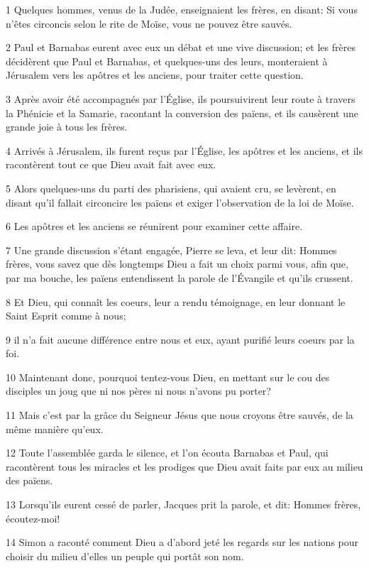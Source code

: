 \par 1 Quelques hommes, venus de la Judée, enseignaient les frères, en disant: Si vous n'êtes circoncis selon le rite de Moïse, vous ne pouvez être sauvés.
\par 2 Paul et Barnabas eurent avec eux un débat et une vive discussion; et les frères décidèrent que Paul et Barnabas, et quelques-uns des leurs, monteraient à Jérusalem vers les apôtres et les anciens, pour traiter cette question.
\par 3 Après avoir été accompagnés par l'Église, ils poursuivirent leur route à travers la Phénicie et la Samarie, racontant la conversion des païens, et ils causèrent une grande joie à tous les frères.
\par 4 Arrivés à Jérusalem, ils furent reçus par l'Église, les apôtres et les anciens, et ils racontèrent tout ce que Dieu avait fait avec eux.
\par 5 Alors quelques-uns du parti des pharisiens, qui avaient cru, se levèrent, en disant qu'il fallait circoncire les païens et exiger l'observation de la loi de Moïse.
\par 6 Les apôtres et les anciens se réunirent pour examiner cette affaire.
\par 7 Une grande discussion s'étant engagée, Pierre se leva, et leur dit: Hommes frères, vous savez que dès longtemps Dieu a fait un choix parmi vous, afin que, par ma bouche, les païens entendissent la parole de l'Évangile et qu'ils crussent.
\par 8 Et Dieu, qui connaît les coeurs, leur a rendu témoignage, en leur donnant le Saint Esprit comme à nous;
\par 9 il n'a fait aucune différence entre nous et eux, ayant purifié leurs coeurs par la foi.
\par 10 Maintenant donc, pourquoi tentez-vous Dieu, en mettant sur le cou des disciples un joug que ni nos pères ni nous n'avons pu porter?
\par 11 Mais c'est par la grâce du Seigneur Jésus que nous croyons être sauvés, de la même manière qu'eux.
\par 12 Toute l'assemblée garda le silence, et l'on écouta Barnabas et Paul, qui racontèrent tous les miracles et les prodiges que Dieu avait faits par eux au milieu des païens.
\par 13 Lorsqu'ils eurent cessé de parler, Jacques prit la parole, et dit: Hommes frères, écoutez-moi!
\par 14 Simon a raconté comment Dieu a d'abord jeté les regards sur les nations pour choisir du milieu d'elles un peuple qui portât son nom.
